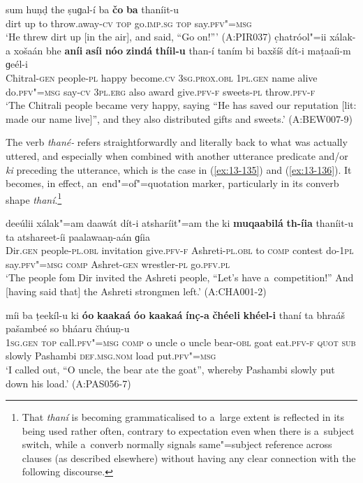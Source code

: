 \ea
\label{ex:13-133}
\gll sum huṇḍ the ṣuɡal-í ba \textbf{čo} \textbf{ba}  thaníit-u \\
dirt up to throw.away-\textsc{cv} \textsc{top} go.\textsc{imp.sg} \textsc{top} say.\textsc{pfv"=msg} \\
\glt `He threw dirt up [in the air], and said, ``Go on!''' (A:PIR037)
\ex
\label{ex:13-134}
\gll c̣hatróol"=ii xálak-a xošaán bhe \textbf{aníi} \textbf{asíi} \textbf{nóo} \textbf{zindá} \textbf{thíil-u} than-í taním bi baxšíš dít-i maṭaaíi-m ɡeél-i\\
Chitral-\textsc{gen} people-\textsc{pl} happy become.\textsc{cv} \textsc{3sg.prox.obl} \textsc{1pl.gen} name alive do.\textsc{pfv"=msg} say-\textsc{cv} \textsc{3pl.erg} also award give.\textsc{pfv-f} sweets-\textsc{pl} throw.\textsc{pfv-f}\\
\glt `The Chitrali people became very happy, saying ``He has saved our reputation [lit: made our name live]'', and they also distributed gifts and sweets.' (A:BEW007-9) 
\z

The verb \textit{thané-} refers straightforwardly and literally back to what was actually uttered,
and especially when combined with another utterance predicate and/or \textit{ki} preceding the
utterance, which is the case in (\ref{ex:13-135}) and (\ref{ex:13-136}). It becomes, in effect,
an~end"=of"=quotation marker, particularly in its converb shape \textit{thaní}.\footnote{That
  \textit{thaní} is becoming grammaticalised to a~large extent is reflected in its being used rather
  often, contrary to expectation even when there is a~subject switch, while a~converb normally
  signals same"=subject reference across clauses (as described elsewhere) without having any clear connection with the following discourse.}

\ea
\label{ex:13-135}
\gll deeúlii xálak"=am daawát dít-i atsharíit"=am the ki \textbf{muqaabilá} \textbf{th-íia} thaníit-u ta atshareet-íi paalawaaṇ-aán ɡíia\\
Dir.\textsc{gen} people-\textsc{pl.obl} invitation give.\textsc{pfv-f}  Ashreti-\textsc{pl.obl} to \textsc{comp} contest do-\textsc{1pl} say.\textsc{pfv"=msg} \textsc{comp} Ashret-\textsc{gen} wrestler-\textsc{pl} go.\textsc{pfv.pl}\\
\glt `The people fom Dir invited the Ashreti people, ``Let's have a~competition!'' And [having said that] the Ashreti strongmen left.' (A:CHA001-2)

\ex
\label{ex:13-136}
\gll míi ba ṭeekíl-u ki \textbf{óo} \textbf{kaakaá} \textbf{óo} \textbf{kaakaá} \textbf{ínc̣-a} \textbf{čhéeli}  \textbf{khéel-i} thaní ta bhraáš pašambeé so bháaru čhúuṇ-u\\
\textsc{1sg.gen} \textsc{top} call.\textsc{pfv"=msg} \textsc{comp} o uncle o uncle bear-\textsc{obl} goat  eat.\textsc{pfv-f} \textsc{quot } \textsc{sub} slowly Pashambi \textsc{def.msg.nom} load put.\textsc{pfv"=msg}  \\
\glt `I called out, ``O uncle, the bear ate the goat'', whereby Pashambi slowly put down his load.' (A:PAS056-7) 
\z

